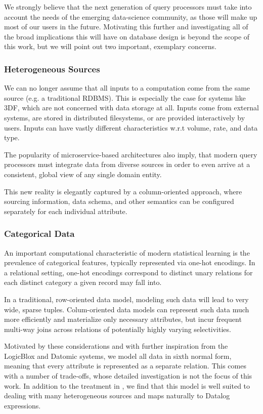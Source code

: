 \documentclass[../index.tex]{subfiles}
\begin{document}
We strongly believe that the next generation of query processors must
take into account the needs of the emerging data-science community, as
those will make up most of our users in the future. Motivating this
further and investigating all of the broad implications this will have
on database design is beyond the scope of this work, but we will point
out two important, exemplary concerns.

\subsubsection{Heterogeneous Sources}

We can no longer assume that all inputs to a computation come from the
same source (e.g. a traditional RDBMS). This is especially the case
for systems like 3DF, which are not concerned with data storage at
all. Inputs come from external systems, are stored in distributed
filesystems, or are provided interactively by users. Inputs can have
vastly different characteristics w.r.t volume, rate, and data type.

The popularity of microservice-based architectures also imply, that
modern query processors must integrate data from diverse sources in
order to even arrive at a consistent, global view of any single domain
entity.

This new reality is elegantly captured by a column-oriented approach,
where sourcing information, data schema, and other semantics can be
configured separately for each individual attribute.

\subsubsection{Categorical Data}

An important computational characteristic of modern statistical
learning is the prevalence of categorical features, typically
represented via one-hot encodings. In a relational setting, one-hot
encodings correspond to distinct unary relations for each distinct
category a given record may fall into.

In a traditional, row-oriented data model, modeling such data will
lead to very wide, sparse tuples. Colum-oriented data models can
represent such data much more efficiently and materialize only
necessary attributes, but incur frequent multi-way joins across
relations of potentially highly varying selectivities.

Motivated by these considerations and with further inspiration from
the LogicBlox and Datomic systems, we model all data in sixth normal
form, meaning that every attribute is represented as a separate
relation. This comes with a number of trade-offs, whose detailed
investigation is not the focus of this work. In addition to the
treatment in \cite{aref2015design}, we find that this model is well
suited to dealing with many heterogeneous sources and maps naturally
to Datalog expressions.
\end{document}
